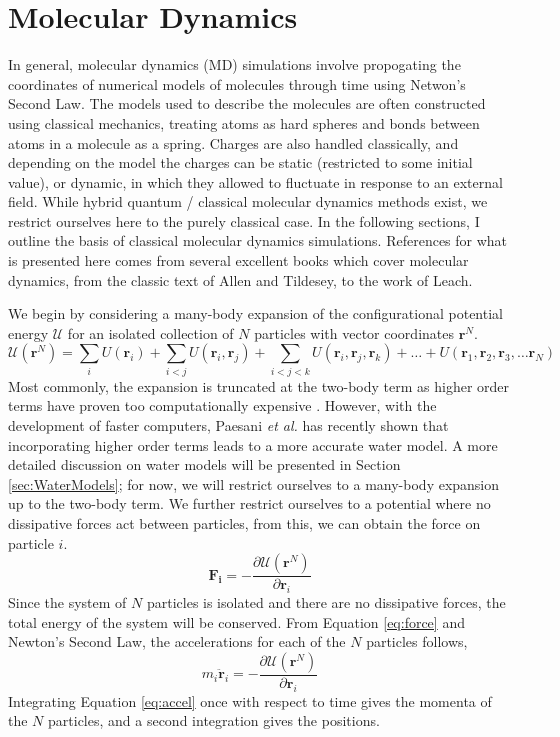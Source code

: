 \section{Molecular Dynamics}
In general, molecular dynamics (MD) simulations involve propogating
the coordinates of numerical models of molecules through time using
Netwon's Second Law. The models used to describe the molecules are
often constructed using classical mechanics, treating atoms as hard
spheres and bonds between atoms in a molecule as a spring. Charges are
also handled classically, and depending on the model the charges can
be static (restricted to some initial value), or dynamic, in which
they allowed to fluctuate in response to an external field. While
hybrid quantum / classical molecular dynamics methods exist, we
restrict ourselves here to the purely classical case. In the following
sections, I outline the basis of classical molecular dynamics
simulations. References for what is presented here comes from several
excellent books which cover molecular dynamics, from the classic text
of Allen and Tildesey, to the work of
Leach.\cite{Allen1987,Leach2001}

We begin by considering a many-body expansion of the configurational
potential energy $\mathscr{U}$ for an isolated collection of $N$ particles with
vector coordinates $\mathbf{r}^N$.
\begin{equation}\label{eq:potE}
  \mathscr{U}(\mathbf{r}^N) = \sum_i U(\mathbf{r}_i) + \sum_{i<j}
  U(\mathbf{r}_i,\mathbf{r}_j) + \sum_{i<j<k}
  U(\mathbf{r}_i,\mathbf{r}_j,\mathbf{r}_k) + \dots + U(\mathbf{r}_1,\mathbf{r}_2,\mathbf{r}_3,\dots \mathbf{r}_N)
\end{equation}
Most commonly, the expansion is truncated at the two-body term as
higher order terms have proven too computationally expensive
. However, with the development of faster computers, Paesani
\textit{et al.} has recently shown that incorporating higher order
terms leads to a more accurate water model.\cite{Paesani2016} A more
detailed discussion on water models will be presented in Section
\ref{sec:WaterModels}; for now, we will restrict ourselves to a
many-body expansion up to the two-body term. We further restrict
ourselves to a potential where no dissipative forces act between
particles, from this, we can obtain the force on particle $i$.
\begin{equation}\label{eq:force}
\mathbf{F_i} = -\frac{\partial \mathscr{U}(\mathbf{r}^N)}{\partial \mathbf{r}_i}
\end{equation} 
Since the system of $N$ particles is isolated and there are no
dissipative forces, the total energy of the system will be
conserved. From Equation \eqref{eq:force} and Newton's Second Law, the
accelerations for each of the $N$ particles follows,
\begin{equation}\label{eq:accel}
 m_i\mathbf{\ddot{r}}_i = -\frac{\partial \mathscr{U}(\mathbf{r}^N)}{\partial \mathbf{r}_i}
\end{equation}
Integrating Equation \eqref{eq:accel} once with respect to time gives
the momenta of the $N$ particles, and a second integration gives the
positions.

